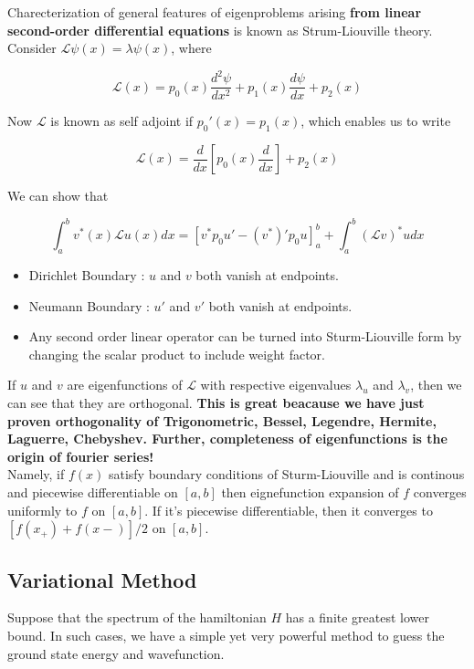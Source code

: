 \documentclass{report}
\begin{document}
\noindent Charecterization of general features of eigenproblems arising \textbf{from linear second-order differential equations} is known as Strum-Liouville theory.\\

\noindent Consider $\mathcal{L}\psi(x) = \lambda\psi(x)$, where

$$\mathcal{L}(x) = p_0(x)\frac{d^2 \psi}{dx^2} + p_1(x)\frac{d\psi}{dx} + p_2(x)$$

\noindent Now $\mathcal{L}$ is known as self adjoint if $p_0'(x) = p_1(x)$, which enables us to write 

$$\mathcal{L}(x) = \frac{d}{dx}\left[p_0(x)\frac{d}{dx}\right]+p_2(x)$$

\noindent We can show that

$$\int_{a}^{b}v^*(x)\mathcal{L}u(x)dx = \left[v^* p_0 u' - (v^*)'p_0 u\right]_{a}^{b} + \int_{a}^{b}(\mathcal{L}v)^* u dx$$

\begin{itemize}
  \item Dirichlet Boundary : $u$ and $v$ both vanish at endpoints.
  \item Neumann Boundary : $u'$ and $v'$ both vanish at endpoints.
  \item Any second order linear operator can be turned into Sturm-Liouville form by changing the scalar product to include weight factor.
\end{itemize}
  
\noindent If $u$ and $v$ are eigenfunctions of $\mathcal{L}$ with respective eigenvalues $\lambda_u$ and $\lambda_v$, then we can see that they are orthogonal. \textbf{This is great beacause we have just proven orthogonality of Trigonometric, Bessel, Legendre, Hermite, Laguerre, Chebyshev. Further, completeness of eigenfunctions is the origin of fourier series!}\\

\noindent Namely, if $f(x)$ satisfy boundary conditions of Sturm-Liouville and is continous and piecewise differentiable on $[a,b]$ then eignefunction expansion of $f$ converges uniformly to $f$ on $[a,b]$. If it's piecewise differentiable, then it converges to $[f(x_+) + f(x-)]/2$ on $[a,b]$.

\subsection{Variational Method}
Suppose that the spectrum of the hamiltonian $H$ has a finite greatest lower bound. In such cases, we have a simple yet very powerful method to guess the ground state energy and wavefunction.
\end{document}
